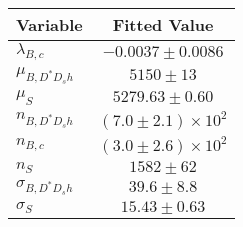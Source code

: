 \begin{tabular}[t]{lc}
\hline
Variable &Fitted Value\\
\hline\hline
$\lambda_{B,c}$&$-0.0037\pm0.0086$\\
\hline
$\mu_{B, D^* D_s h}$&$5150\pm13$\\
\hline
$\mu_S$&$5279.63\pm0.60$\\
\hline
$n_{B, D^* D_s h}$&$(7.0\pm2.1)\times 10^2$\\
\hline
$n_{B,c}$&$(3.0\pm2.6)\times 10^2$\\
\hline
$n_S$&$1582\pm62$\\
\hline
$\sigma_{B, D^* D_s h}$&$39.6\pm8.8$\\
\hline
$\sigma_S$&$15.43\pm0.63$\\
\hline
\end{tabular}